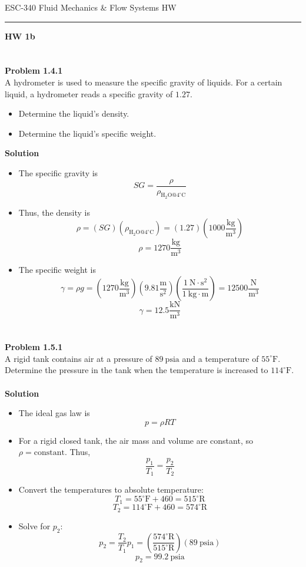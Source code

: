 ﻿\documentclass[12pt]{article}
\begin{document}
\begin{center}
{\LARGE ESC-340 Fluid Mechanics \& Flow Systems HW\par}
\end{center}
\hrule
\vspace{1.5em}
\begin{center}
    {\LARGE\bfseries HW 1b\par}
\end{center}
\section*{}
\textbf{Problem 1.4.1}\\
A hydrometer is used to measure the specific gravity of liquids. For a certain liquid, a hydrometer reads a specific gravity of $1.27$.
\begin{itemize}
\item[(a)] Determine the liquid's density.
\item[(b)] Determine the liquid's specific weight.
\end{itemize}
\textbf{Solution}
\begin{itemize}
\item The specific gravity is
\[
SG=\frac{\rho}{\rho_{\mathrm{H_2O}@4^\circ\mathrm{C}}}
\]
\item[(a)] Thus, the density is
\[
\rho=(SG)\left(\rho_{\mathrm{H_2O}@4^\circ\mathrm{C}}\right)
=(1.27)\left(1000\frac{\mathrm{kg}}{\mathrm{m}^3}\right)
\]
\[
\boxed{\rho=1270\frac{\mathrm{kg}}{\mathrm{m}^3}}
\]
\item[(b)] The specific weight is
\[
\gamma=\rho g
=\left(1270\frac{\mathrm{kg}}{\mathrm{m}^3}\right)\left(9.81\frac{\mathrm{m}}{\mathrm{s}^2}\right)\left(\frac{1\ \mathrm{N}\cdot\mathrm{s}^2}{1\ \mathrm{kg}\cdot\mathrm{m}}\right)
=12500\frac{\mathrm{N}}{\mathrm{m}^3}
\]
\[
\boxed{\gamma=12.5\frac{\mathrm{kN}}{\mathrm{m}^3}}
\]
\end{itemize}
\section*{}
\textbf{Problem 1.5.1}\\
A rigid tank contains air at a pressure of $89\ \mathrm{psia}$ and a temperature of $55^\circ\mathrm{F}$. Determine the pressure in the tank when the temperature is increased to $114^\circ\mathrm{F}$.\\\\
\textbf{Solution}
\begin{itemize}
\item The ideal gas law is
\[
p=\rho RT
\]
\item For a rigid closed tank, the air mass and volume are constant, so $\rho=\text{constant}$. Thus,
\[
\frac{p_1}{T_1}=\frac{p_2}{T_2}
\]
\item Convert the temperatures to absolute temperature:
\[
T_1=55^\circ\mathrm{F}+460=515^\circ\mathrm{R}
\]
\[
T_2=114^\circ\mathrm{F}+460=574^\circ\mathrm{R}
\]
\item Solve for $p_2$:
\[
p_2=\frac{T_2}{T_1}p_1
=\left(\frac{574^\circ\mathrm{R}}{515^\circ\mathrm{R}}\right)(89\ \mathrm{psia})
\]
\[
\boxed{p_2=99.2\ \mathrm{psia}}
\]
\end{itemize}
\end{document}
